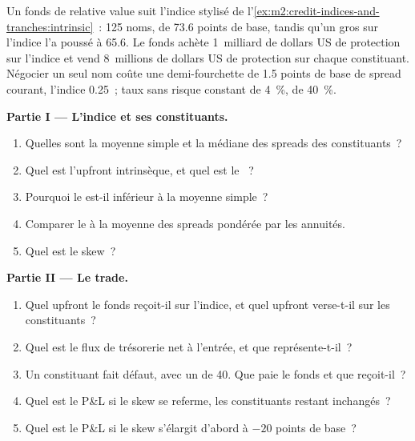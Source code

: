 \begin{problem}\label{pb:m2:credit-indices-and-tranches:1}
Un fonds de relative value suit l'indice stylisé de
l'\cref{ex:m2:credit-indices-and-tranches:intrinsic}~: 125 noms,  de 73.6
points de base, tandis qu'un gros  sur l'indice l'a poussé à 65.6.
Le fonds achète 1~milliard de dollars US de protection sur l'indice et vend 8~millions de dollars US de protection
sur chaque constituant. Négocier un seul nom coûte une demi-fourchette de 1.5 points de base
de spread courant, l'indice 0.25~; taux sans risque constant de 4~\%,  de 40~\%.

\medskip\noindent\textbf{Partie I --- L'indice et ses constituants.}
\begin{enumerate}
\item Quelles sont la moyenne simple et la médiane des spreads des constituants~?
\item Quel est l'upfront intrinsèque, et quel est le ~?
\item Pourquoi le  est-il inférieur à la moyenne simple~?
\item Comparer le  à la moyenne des spreads pondérée par les annuités.
\item Quel est le skew~?
\end{enumerate}

\medskip\noindent\textbf{Partie II --- Le trade.}
\begin{enumerate}[resume]
\item Quel upfront le fonds reçoit-il sur l'indice, et quel upfront verse-t-il sur les constituants~?
\item Quel est le flux de trésorerie net à l'entrée, et que représente-t-il~?
\item Un constituant fait défaut, avec un  de 40. Que paie le fonds
et que reçoit-il~?
\item Quel est le P\&L si le skew se referme, les constituants restant inchangés~?
\item Quel est le P\&L si le skew s'élargit d'abord à $-20$ points de base~?
\end{enumerate}


\end{problem}
